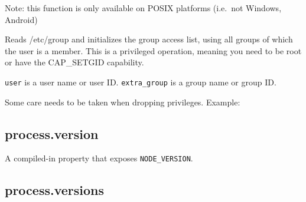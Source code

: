 Note: this function is only available on POSIX platforms (i.e.~not
Windows, Android)

Reads /etc/group and initializes the group access list, using all groups
of which the user is a member. This is a privileged operation, meaning
you need to be root or have the CAP\_SETGID capability.

\texttt{user} is a user name or user ID. \texttt{extra\_group} is a
group name or group ID.

Some care needs to be taken when dropping privileges. Example:

\begin{Shaded}
\begin{Highlighting}[]
\NormalTok{(}\NormalTok{());         }\CommentTok{// [ 0 ]}
\NormalTok{(}\NormalTok{, }\NormalTok{);   }
\NormalTok{(}\NormalTok{());         }\CommentTok{// [ 27, 30, 46, 1000, 0 ]}
\NormalTok{(}\NormalTok{);                     }
\NormalTok{(}\NormalTok{());         }\CommentTok{// [ 27, 30, 46, 1000 ]}
\end{Highlighting}
\end{Shaded}

\subsection{process.version}\label{process.version}

A compiled-in property that exposes \texttt{NODE\_VERSION}.

\begin{Shaded}
\begin{Highlighting}[]
\NormalTok{(} \NormalTok{+ }\NormalTok{);}
\end{Highlighting}
\end{Shaded}

\subsection{process.versions}\label{process.versions}

